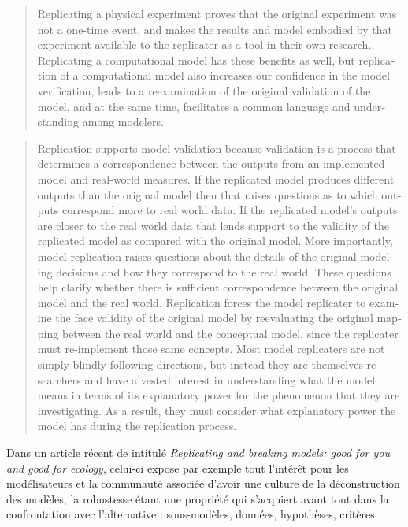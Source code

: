 \foreignblockquote{english}[\cite{Wilensky2007a}]{Replicating a physical experiment proves that the original experiment was not a one-time event, and makes the results and model embodied by that experiment available to the replicater as a tool in their own research. Replicating a computational model has these benefits as well, but replication of a computational model also increases our confidence in the model verification, leads to a reexamination of the original validation of the model, and at the same time, facilitates a common language and understanding among modelers.}

\foreignblockquote{english}[\cite{Wilensky2007a}]{Replication supports model validation because validation is a process that determines a correspondence between the outputs from an implemented model and real-world measures. If the replicated model produces different outputs than the original model then that raises questions as to which outputs correspond more to real world data. If the replicated model's outputs are closer to the real world data that lends support to the validity of the replicated model as compared with the original model. More importantly, model replication raises questions about the details of the original modeling decisions and how they correspond to the real world. These questions help clarify whether there is sufficient correspondence between the original model and the real world. Replication forces the model replicater to examine the face validity of the original model by reevaluating the original mapping between the real world and the conceptual model, since the replicater must re-implement those same concepts. Most model replicaters are not simply blindly following directions, but instead they are themselves researchers and have a vested interest in understanding what the model means in terms of its explanatory power for the phenomenon that they are investigating. As a result, they must consider what explanatory power the model has during the replication process.}

Dans un article récent de \textcite{Thiele2015} intitulé \textit{Replicating and breaking models: good for you and good for ecology}, celui-ci expose par exemple tout l'intérêt pour les modélisateurs et la communauté associée d'avoir une culture de la déconstruction des modèles, la robustesse étant une propriété qui s'acquiert avant tout dans la confrontation avec l'alternative : sous-modèles, données, hypothèses, critères.

